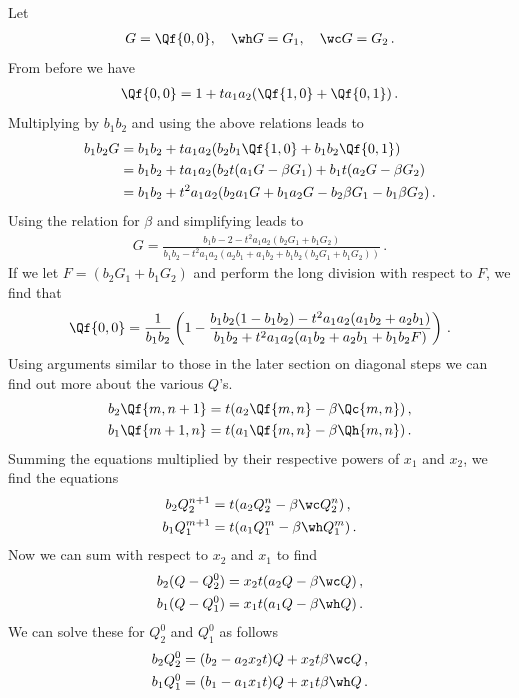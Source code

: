 Let
\begin{align}
	G = \Qf{0,0}, \quad\wh G = G_1, \quad\wc G = G_2\,.
\end{align}
From before we have
\begin{align}
	\Qf{0,0} = 1 + t a_1a_2(\Qf{1,0}+\Qf{0,1})\,.
\end{align}
Multiplying by $b_1b_2$ and using the above relations leads to
\begin{align}
\begin{split}
b_1b_2 G &= b_1b_2 + ta_1a_2(b_2b_1\Qf{1,0}+b_1b_2\Qf{0,1})\\
                 &=b_1b_2 + ta_1a_2(b_2t(a_1G-\beta G_1)+b_1t(a_2 G- \beta G_2)\\
                 &=b_1b_2 + t^2a_1a_2(b_2a_1G+b_1a_2G-b_2\beta G_1-b_1\beta G_2)\,.
\end{split}
\end{align}
Using the relation for $\beta$ and simplifying leads to
\begin{align}
	G = \frac{b_1b-2 - t^2 a_1a_2(b_2G_1+b_1G_2)}{b_1b_2 - t^2a_1a_2 (a_2b_1+a_1b_2+b_1b_2(b_2G_1+b_1G_2))}\,.
\end{align}
If we let $F = (b_2G_1+b_1G_2)$ and perform the long division with respect to $F$, we find that
\begin{align}
	\Qf{0,0} = \frac{1}{b_1b_2}\left(1-\frac{b_1b_2(1-b_1b_2)-t^2a_1a_2(a_1b_2+a_2b_1)}{b_1b_2+t^2a_1a_2(a_1b_2+a_2b_1+b_1b_2 F)}\right)\,.
\end{align}
Using arguments similar to those in the later section on diagonal steps we can find out more about the various $Q$'s.
\begin{align}
	b_2\Qf{m,n+1} &= t(a_2\Qf{m,n}-\beta \Qc{m,n})\,,\\
	b_1\Qf{m+1,n} &= t(a_1\Qf{m,n}-\beta \Qh{m,n})\,.
\end{align}
Summing the equations multiplied by their respective powers of $x_1$ and $x_2$, we find the equations
\begin{align}
	b_2 Q_2^{n+1} &= t(a_2Q_2^n-\beta \wc Q_2^n)\,,\\
	b_1 Q_1^{m+1} &= t(a_1Q_1^m-\beta \wh Q_1^m)\,.
\end{align}
Now we can sum with respect to $x_2$ and $x_1$ to find
\begin{align}
	b_2 (Q-Q_2^0) &= x_2t(a_2Q - \beta \wc Q)\,,\\
	b_1 (Q-Q_1^0) &= x_1t(a_1Q - \beta \wh Q)\,.
\end{align}
We can solve these for $Q_2^0$ and $Q_1^0$ as follows
\begin{align}
	b_2Q_2^0 &= (b_2-a_2x_2t)Q + x_2t\beta \wc Q\,,\\
	b_1Q_1^0 &= (b_1-a_1x_1t)Q + x_1t\beta \wh Q\,.
\end{align}
